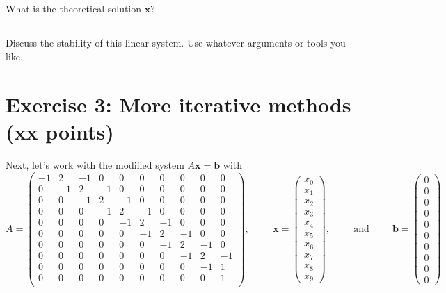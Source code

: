 \subsection{} What is the theoretical solution $\mathbf{x}$? 

\subsection{} Discuss the stability of this linear system. Use whatever arguments or tools you like.

\section*{Exercise 3: More iterative methods \normalsize \textnormal(xx points)}

Next, let's work with the modified system $A\mathbf{x}=\mathbf{b}$ with
\begin{equation*}
A = 
\left(\begin{matrix}
-1& 2& -1& 0& 0& 0& 0& 0& 0& 0\\
0& -1& 2& -1& 0& 0& 0& 0& 0& 0\\
0& 0& -1& 2& -1& 0& 0& 0& 0& 0\\
0& 0& 0& -1& 2& -1& 0& 0& 0& 0\\
0& 0& 0& 0& -1& 2& -1& 0& 0& 0\\
0& 0& 0& 0& 0& -1& 2& -1& 0& 0\\
0& 0& 0& 0& 0& 0& -1& 2& -1& 0\\
0& 0& 0& 0& 0& 0& 0& -1& 2& -1\\
0& 0& 0& 0& 0& 0& 0& 0& -1& 1\\
0& 0& 0& 0& 0& 0& 0& 0& 0& 1\\
\end{matrix} \right),  \hspace{1cm} 
\mathbf{x} = \left(\begin{matrix}
x_0\\
x_1\\
x_2\\
x_3\\
x_4\\
x_5\\
x_6\\
x_7\\
x_8\\
x_9
\end{matrix} \right), \hspace{1cm} \text{and} \hspace{1cm}
\mathbf{b} = \left(\begin{matrix}
0\\
0\\
0\\
0\\
0\\
0\\
0\\
0\\
0\\
0
\end{matrix} \right)
\end{equation*}


